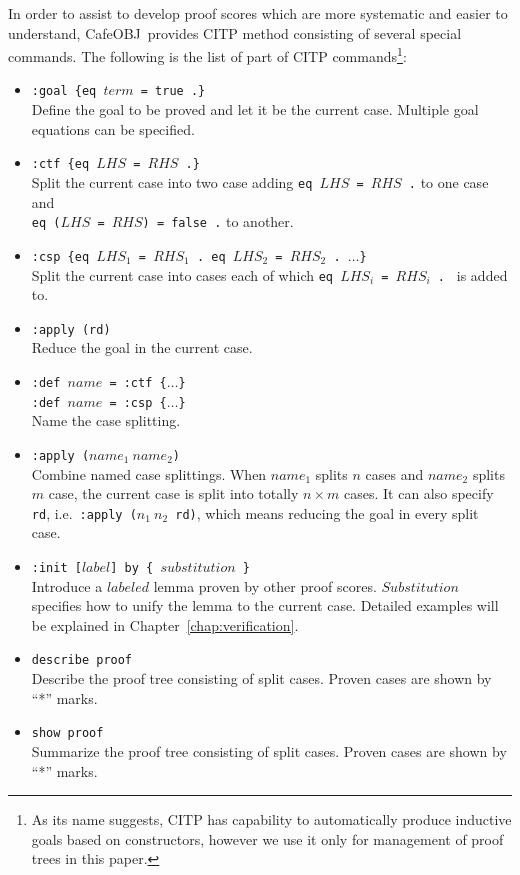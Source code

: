 \documentclass[12pt]{report}
\newcommand{\stt}[1]{{\small{\tt {#1}}}}
\newcommand{\cafeobj}{{\sf CafeOBJ}~}
\begin{document}
In order to assist to develop proof scores which are more systematic
and easier to understand, \cafeobj provides CITP method consisting of
several special commands. The following is the list of part of CITP
commands\footnote{As its name suggests, CITP has capability to
  automatically produce inductive goals based on constructors, however
  we use it only for management of proof trees in this paper.}:
\begin{itemize}
\item \stt{:goal \{eq $term$ = true .\}}\\ Define the goal to be
  proved and let it be the current case. Multiple goal equations
  can be specified.
\item \stt{:ctf \{eq $LHS$ = $RHS$ .\}}\\
  Split the current case into two case adding \stt{eq~$LHS$~=~$RHS$~.} to one case and\\
  \stt{eq~($LHS$~=~$RHS$)~=~false~.} to another.
\item \stt{:csp \{eq $LHS_1$ = $RHS_1$ . eq $LHS_2$ = $RHS_2$ . $\dots$\}}\\
  Split the current case into cases each of which
  \stt{eq~$LHS_i$~=~$RHS_i$~.~} is added to.
\item \stt{:apply (rd)}\\
 Reduce the goal in the current case.
\item \stt{:def $name$ = :ctf \{$\dots$\}}\\
  \stt{:def $name$ = :csp \{$\dots$\}}\\
  Name the case splitting.
\item \stt{:apply ($name_1\ name_2$)}\\ Combine named case
  splittings. When $name_1$ splits $n$ cases and $name_2$ splits $m$
  case, the current case is split into totally $n\times m$ cases.  It
  can also specify {\tt rd}, i.e.\ \stt{:apply~($n_1\ n_2$~rd)}, which
    means reducing the goal in every split case.
\item \stt{:init [$label$] by \{ $substitution$ \}}\\
  Introduce a $labeled$ lemma proven by other proof scores. $Substitution$ specifies
  how to unify the lemma to the current case. Detailed examples will be explained
  in Chapter~\ref{chap:verification}.
\item \stt{describe proof}\\
 Describe the proof tree consisting of split cases. Proven cases are shown by ``*'' marks.
\item \stt{show proof}\\
Summarize the proof tree consisting of split cases. Proven cases are shown by ``*'' marks.
\end{itemize}
\end{document}
